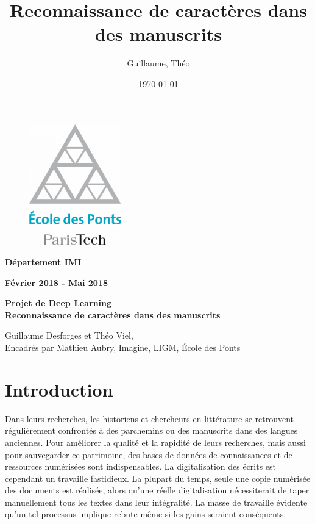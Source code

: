 \documentclass{report}
\title{Reconnaissance de caractères dans des manuscrits}
\date{\today}
\author{\bsc{Desforges} Guillaume, \bsc{Viel} Théo}
\begin{document}
\thispagestyle{empty}
\begin{center}

    \begin{figure}[!htb]
        \begin{center}
            \includegraphics[width=4cm]{logo_enpc.png}
        \end{center}
    \end{figure}

    \vspace{0.5cm}

    {\large{\bf Département IMI}}

    \vspace{0.2cm}

    {\large{\bf Février 2018 - Mai 2018}}

    \vspace{1.5cm}

    \large{ \bf Projet de Deep Learning}\\
    \vspace{0.2cm}
    {\Large{\bf Reconnaissance de caractères dans des manuscrits}}

    \vspace{1cm}

    \large{Guillaume Desforges et Théo Viel},\\
    \vspace{0.2cm}
    \large{Encadrés par Mathieu Aubry, Imagine, LIGM, École des Ponts}

\end{center}
\newpage

\chapter*{Introduction}

Dans leurs recherches, les historiens et chercheurs en littérature se retrouvent régulièrement confrontés à des parchemins ou des manuscrits dans des langues anciennes.
Pour améliorer la qualité et la rapidité de leurs recherches, mais aussi pour sauvegarder ce patrimoine, des bases de données de connaissances et de ressources numérisées sont indispensables.
La digitalisation des écrits est cependant un travaille fastidieux.
La plupart du temps, seule une copie numérisée des documents est réalisée, alors qu'une réelle digitalisation nécessiterait de taper manuellement tous les textes dans leur intégralité.
La masse de travaille évidente qu'un tel processus implique rebute même si les gains seraient conséquents.
\end{document}
